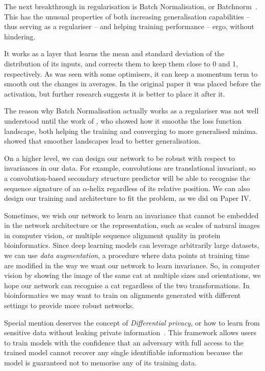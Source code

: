 The next breakthrough in regularisation is Batch Normalisation, 
or Batchnorm~\citep{bn}.
This has the unusual properties of both increasing generalisation capabilities -- thus serving as a regulariser -- and helping training performance -- ergo, without hindering.

It works as a layer that learns the mean and standard deviation of the distribution of its inputs, and corrects them to keep them close to 0 and 1, respectively.
As was seen with some optimisers, it can keep a momentum term to smooth out the changes in averages.
In the original paper it was placed before the activation, but further research suggests it is better to place it after it.

The reason why Batch Normalisation actually works as a regulariser was not well understood until the work of \citet{how_bn_works}, who showed how it smooths the loss function landscape, both helping the training and converging to more generalised minima.
\citet{large_batch} showed that smoother landscapes lead to better generalisation.

On a higher level,
we can design our network to be robust with respect to invariances in our data.
For example, convolutions are translational invariant, so a convolution-based secondary structure predictor will be able to recognise the sequence signature of an $\alpha$-helix regardless of its relative position.
We can also  design our training and architecture to fit the problem, as we did on Paper IV.

Sometimes,  we wish our network to learn an invariance that cannot be embedded in the network architecture or the representation, such as scales of natural images in computer vision, or multiple sequence alignment quality in protein bioinformatics.
Since deep learning models can leverage arbitrarily large datasets, we can use \emph{data augmentation}, a procedure where data points at training time are modified in the way we want our network to learn invariance.
So, in computer vision by showing the image of the same cat at multiple sizes and orientations, we hope our network can recognise a cat regardless of the two transformations.
In bioinformatics we may want to train on alignments generated with different settings to provide more robust networks.

Special mention deserves the concept of \emph{Differential privacy}, 
or how to learn from sensitive data without leaking private information~\citep{differential_privacy}.
This framework allows users to train models with the confidence that an adversary with full access to the trained model cannot recover any single identifiable information because the model is guaranteed not to memorise any of its training data.

